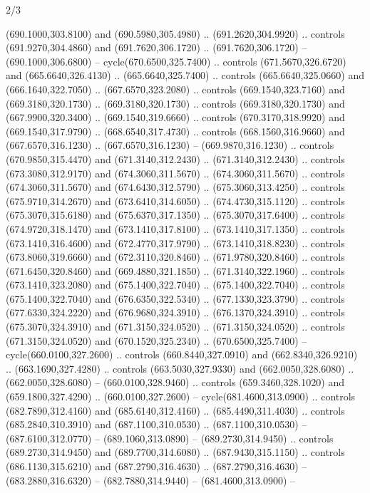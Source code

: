 \begin{flagdescription}{2/3}
\begin{scope}[xshift=0.5\flaglength,yshift=0.5\flagwidth,scale=\flagwidth/638.38]
\begin{scope}[y=0.80pt, x=0.80pt, yscale=-1,shift={(-600,-400)}]
\begin{scope}[shift={(-0.02,2.173)}]
  (690.1000,303.8100) and (690.5980,305.4980) .. (691.2620,304.9920) .. controls
  (691.9270,304.4860) and (691.7620,306.1720) .. (691.7620,306.1720) --
  (690.1000,306.6800) -- cycle(670.6500,325.7400) .. controls
  (671.5670,326.6720) and (665.6640,326.4130) .. (665.6640,325.7400) .. controls
  (665.6640,325.0660) and (666.1640,322.7050) .. (667.6570,323.2080) .. controls
  (669.1540,323.7160) and (669.3180,320.1730) .. (669.3180,320.1730) .. controls
  (669.3180,320.1730) and (667.9900,320.3400) .. (669.1540,319.6660) .. controls
  (670.3170,318.9920) and (669.1540,317.9790) .. (668.6540,317.4730) .. controls
  (668.1560,316.9660) and (667.6570,316.1230) .. (667.6570,316.1230) --
  (669.9870,316.1230) .. controls (670.9850,315.4470) and (671.3140,312.2430) ..
  (671.3140,312.2430) .. controls (673.3080,312.9170) and (674.3060,311.5670) ..
  (674.3060,311.5670) .. controls (674.3060,311.5670) and (674.6430,312.5790) ..
  (675.3060,313.4250) .. controls (675.9710,314.2670) and (673.6410,314.6050) ..
  (674.4730,315.1120) .. controls (675.3070,315.6180) and (675.6370,317.1350) ..
  (675.3070,317.6400) .. controls (674.9720,318.1470) and (673.1410,317.8100) ..
  (673.1410,317.1350) .. controls (673.1410,316.4600) and (672.4770,317.9790) ..
  (673.1410,318.8230) .. controls (673.8060,319.6660) and (672.3110,320.8460) ..
  (671.9780,320.8460) .. controls (671.6450,320.8460) and (669.4880,321.1850) ..
  (671.3140,322.1960) .. controls (673.1410,323.2080) and (675.1400,322.7040) ..
  (675.1400,322.7040) .. controls (675.1400,322.7040) and (676.6350,322.5340) ..
  (677.1330,323.3790) .. controls (677.6330,324.2220) and (676.9680,324.3910) ..
  (676.1370,324.3910) .. controls (675.3070,324.3910) and (671.3150,324.0520) ..
  (671.3150,324.0520) .. controls (671.3150,324.0520) and (670.1520,325.2340) ..
  (670.6500,325.7400) -- cycle(660.0100,327.2600) .. controls
  (660.8440,327.0910) and (662.8340,326.9210) .. (663.1690,327.4280) .. controls
  (663.5030,327.9330) and (662.0050,328.6080) .. (662.0050,328.6080) --
  (660.0100,328.9460) .. controls (659.3460,328.1020) and (659.1800,327.4290) ..
  (660.0100,327.2600) -- cycle(681.4600,313.0900) .. controls
  (682.7890,312.4160) and (685.6140,312.4160) .. (685.4490,311.4030) .. controls
  (685.2840,310.3910) and (687.1100,310.0530) .. (687.1100,310.0530) --
  (687.6100,312.0770) -- (689.1060,313.0890) -- (689.2730,314.9450) .. controls
  (689.2730,314.9450) and (689.7700,314.6080) .. (687.9430,315.1150) .. controls
  (686.1130,315.6210) and (687.2790,316.4630) .. (687.2790,316.4630) --
  (683.2880,316.6320) -- (682.7880,314.9440) -- (681.4600,313.0900) --

\end{scope}
\end{scope}
\end{scope}
\end{flagdescription}
